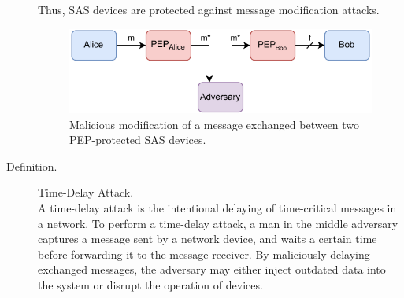 \begin{description}
    Thus, SAS devices are protected against message modification attacks.
    \begin{figure}
        \centering
        \includegraphics[width=0.75\linewidth]{figures/attack_message_modification.drawio.pdf}
        \caption{Malicious modification of a message exchanged between two PEP-protected SAS devices.}
        \label{fig:attack_message_modification}
    \end{figure}

    \item[Definition.] Time-Delay Attack.\\
    A time-delay attack is the intentional delaying of time-critical messages in a network.
    To perform a time-delay attack, a man in the middle adversary captures a message sent by a network device, and waits a certain time before forwarding it to the message receiver.
    By maliciously delaying exchanged messages, the adversary may either inject outdated data into the system or disrupt the operation of devices.


\end{description}
